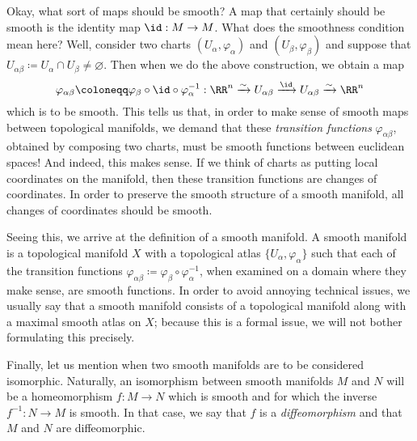 \documentclass{axolotl}
\begin{document}
Okay, what sort of maps should be smooth? A map that certainly should be smooth
is the identity map \(\id: M \to M\). What does the smoothness condition mean
here? Well, consider two charts \((U_\alpha,\varphi_\alpha)\) and
\((U_\beta,\varphi_\beta)\) and suppose that \(U_{\alpha\beta} \coloneqq
  U_\alpha \cap U_\beta \neq \varnothing\). Then when we do the above
construction, we obtain a map
\[ \varphi_{\alpha\beta} \coloneqq \varphi_\beta \circ \id \circ \varphi_\alpha^{-1}: \RR^n \xrightarrow{\sim} U_{\alpha\beta} \xrightarrow{\id} U_{\alpha\beta} \xrightarrow{\sim} \RR^n \]
which is to be smooth. This tells us that, in order to make sense of smooth
maps between topological manifolds, we demand that these \textit{transition
  functions} \(\varphi_{\alpha\beta}\), obtained by composing two charts, must
be smooth functions between euclidean spaces! And indeed, this makes sense. If
we think of charts as putting local coordinates on the manifold, then these
transition functions are changes of coordinates. In order to preserve the
smooth structure of a smooth manifold, all changes of coordinates should be
smooth.

Seeing this, we arrive at the definition of a smooth manifold. A smooth
manifold is a topological manifold \(X\) with a topological atlas
\(\{U_\alpha,\varphi_\alpha\}\) such that each of the transition functions
\(\varphi_{\alpha\beta} \coloneqq \varphi_\beta\circ\varphi_\alpha^{-1}\), when
examined on a domain where they make sense, are smooth functions. In order to
avoid annoying technical issues, we usually say that a smooth manifold consists
of a topological manifold along with a maximal smooth atlas on \(X\); because
this is a formal issue, we will not bother formulating this precisely.

Finally, let us mention when two smooth manifolds are to be considered
isomorphic. Naturally, an isomorphism between smooth manifolds \(M\) and \(N\)
will be a homeomorphism \(f: M \to N\) which is smooth and for which the
inverse \(f^{-1}: N \to M\) is smooth. In that case, we say that \(f\) is a
\textit{diffeomorphism} and that \(M\) and \(N\) are diffeomorphic.
\end{document}
